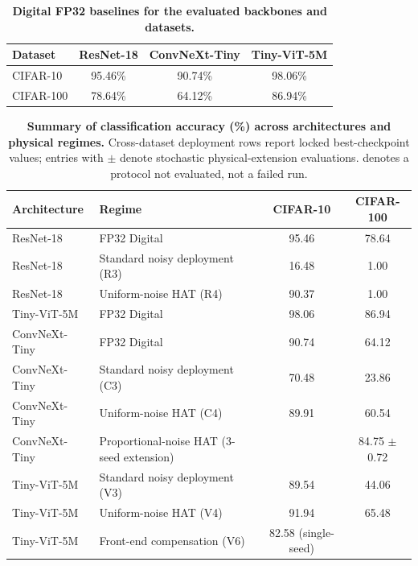 \begin{table}[ht]
    \centering
    \caption{\textbf{Digital FP32 baselines for the evaluated backbones and datasets.}}
    \label{tab:supp-fp32-baselines}
    \begin{tabular}{lccc}
        \toprule
        \textbf{Dataset} & \textbf{ResNet-18} & \textbf{ConvNeXt-Tiny} & \textbf{Tiny-ViT-5M} \\
        \midrule
        CIFAR-10 & 95.46\% & 90.74\% & 98.06\% \\
        CIFAR-100 & 78.64\% & 64.12\% & 86.94\% \\
        \bottomrule
    \end{tabular}
\end{table}

\begin{table}[ht]
    \centering
    \caption{\textbf{Summary of classification accuracy (\%) across architectures and physical regimes.} Cross-dataset deployment rows report locked best-checkpoint values; entries with $\pm$ denote stochastic physical-extension evaluations. \notevaluated{} denotes a protocol not evaluated, not a failed run.}
    \label{tab:supp-result-summary}
    \small
    \begin{tabular}{llcc}
        \toprule
        \textbf{Architecture} & \textbf{Regime} & \textbf{CIFAR-10} & \textbf{CIFAR-100} \\
        \midrule
        ResNet-18 & FP32 Digital & 95.46 & 78.64 \\
        ResNet-18 & Standard noisy deployment (R3) & 16.48 & 1.00 \\
        ResNet-18 & Uniform-noise HAT (R4) & 90.37 & 1.00 \\
        Tiny-ViT-5M & FP32 Digital & 98.06 & 86.94 \\
        ConvNeXt-Tiny & FP32 Digital & 90.74 & 64.12 \\
        ConvNeXt-Tiny & Standard noisy deployment (C3) & 70.48 & 23.86 \\
        ConvNeXt-Tiny & Uniform-noise HAT (C4) & 89.91 & 60.54 \\
        ConvNeXt-Tiny & Proportional-noise HAT (3-seed extension) & \notevaluated{} & 84.75 $\pm$ 0.72 \\
        \midrule
        Tiny-ViT-5M & Standard noisy deployment (V3) & 89.54 & 44.06 \\
        Tiny-ViT-5M & Uniform-noise HAT (V4) & 91.94 & 65.48 \\
        Tiny-ViT-5M & Front-end compensation (V6) & 82.58 (single-seed) & \notevaluated{} \\
        \bottomrule
    \end{tabular}
\end{table}

